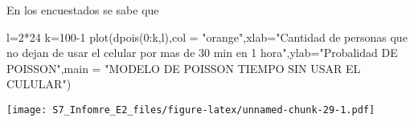 \documentclass[
]{article}
\newenvironment{Shaded}{\begin{snugshade}}{\end{snugshade}}
\newcommand{\AttributeTok}[1]{\textcolor[rgb]{0.77,0.63,0.00}{#1}}
\newcommand{\DecValTok}[1]{\textcolor[rgb]{0.00,0.00,0.81}{#1}}
\newcommand{\FunctionTok}[1]{\textcolor[rgb]{0.00,0.00,0.00}{#1}}
\newcommand{\NormalTok}[1]{#1}
\newcommand{\OtherTok}[1]{\textcolor[rgb]{0.56,0.35,0.01}{#1}}
\newcommand{\SpecialCharTok}[1]{\textcolor[rgb]{0.00,0.00,0.00}{#1}}
\newcommand{\StringTok}[1]{\textcolor[rgb]{0.31,0.60,0.02}{#1}}
\begin{document}
En los encuestados se sabe que

\begin{Shaded}
\begin{Highlighting}[]
\NormalTok{l}\OtherTok{=}\DecValTok{2}\SpecialCharTok{*}\DecValTok{24}
\NormalTok{k}\OtherTok{=}\DecValTok{100{-}1}
\FunctionTok{plot}\NormalTok{(}\FunctionTok{dpois}\NormalTok{(}\DecValTok{0}\SpecialCharTok{:}\NormalTok{k,l),}\AttributeTok{col =} \StringTok{"orange"}\NormalTok{,}\AttributeTok{xlab=}\StringTok{"Cantidad de personas que no dejan de usar el celular por mas de 30 min en 1 hora"}\NormalTok{,}\AttributeTok{ylab=}\StringTok{"Probalidad DE POISSON"}\NormalTok{,}\AttributeTok{main =} \StringTok{"MODELO DE POISSON TIEMPO SIN USAR EL CULULAR"}\NormalTok{)}
\end{Highlighting}
\end{Shaded}

\texttt{[image: S7\_Infomre\_E2\_files/figure-latex/unnamed-chunk-29-1.pdf]}
\end{document}
